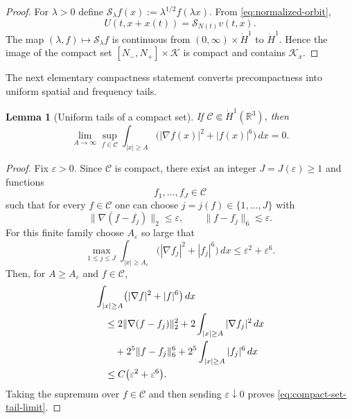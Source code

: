 \documentclass[preprint,12pt]{elsarticle}
\numberwithin{equation}{section}
\newtheorem{lemma}[theorem]{Lemma}
\theoremstyle{remark}
\newcommand{\R}{\mathbb R}
\newcommand{\dd}{\,d}
\begin{document}
\begin{proof}
For $\lambda>0$ define $\mathcal S_\lambda f(x):=\lambda^{1/2}f(\lambda x)$. From \eqref{eq:normalized-orbit},
\[
  U(t,x+x(t))=\mathcal S_{N(t)}v(t,x).
\]
The map $(\lambda,f)\mapsto\mathcal S_\lambda f$ is continuous from $(0,\infty)\times\dot H^1$ to $\dot H^1$. Hence the image of the compact set $[N_-,N_+]\times\mathcal K$ is compact and contains $\mathcal K_x$.
\end{proof}

The next elementary compactness statement converts precompactness into uniform spatial and frequency tails.

\begin{lemma}[Uniform tails of a compact set]\label{lem:compact-set-tails}
If $\mathcal C\Subset\dot H^1(\R^3)$, then
\begin{equation}\label{eq:compact-set-tail-limit}
  \lim_{A\to\infty}
  \sup_{f\in\mathcal C}
  \int_{|x|\ge A}\bigl(|\nabla f(x)|^2+|f(x)|^6\bigr)\dd x=0.
\end{equation}
\end{lemma}

\begin{proof}
Fix $\varepsilon>0$. Since $\mathcal C$ is compact, there exist an integer $J=J(\varepsilon)\ge1$ and functions
\begin{equation*}
  f_1,\dots,f_J\in\mathcal C
\end{equation*}
such that for every $f\in\mathcal C$ one can choose $j=j(f)\in\{1,\dots,J\}$ with
\begin{equation*}
  \|\nabla(f-f_j)\|_2
  \le\varepsilon,
  \qquad
  \|f-f_j\|_6\lesssim\varepsilon.
\end{equation*}
For this finite family choose $A_\varepsilon$ so large that
\begin{equation*}
  \max_{1\le j\le J}
  \int_{|x|\ge A_\varepsilon}
  \bigl(|\nabla f_j|^2+|f_j|^6\bigr)\dd x
  \le\varepsilon^2+\varepsilon^6.
\end{equation*}
Then, for $A\ge A_\varepsilon$ and $f\in\mathcal C$,
\begin{align*}
 &\int_{|x|\ge A}
  \bigl(|\nabla f|^2+|f|^6\bigr)\dd x\notag\\
 &\quad\le
  2\|\nabla(f-f_j)\|_2^2
  +2\int_{|x|\ge A}|\nabla f_j|^2\dd x\notag\\
 &\qquad
  +2^5\|f-f_j\|_6^6
  +2^5\int_{|x|\ge A}|f_j|^6\dd x\notag\\
 &\quad\le C\bigl(\varepsilon^2+\varepsilon^6\bigr).
\end{align*}
Taking the supremum over $f\in\mathcal C$ and then sending $\varepsilon\downarrow0$ proves \eqref{eq:compact-set-tail-limit}.
\end{proof}
\end{document}

